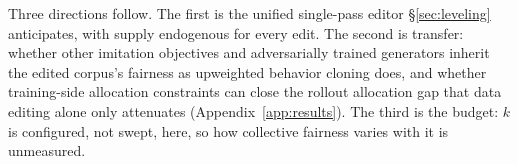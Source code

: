 Three directions follow. The first is the unified single-pass editor
\S\ref{sec:leveling} anticipates, with supply endogenous for every edit. The
second is transfer: whether other imitation objectives and adversarially
trained generators inherit the edited corpus's fairness as upweighted behavior
cloning does, and whether training-side allocation constraints can close the
rollout allocation gap that data editing alone only attenuates
(Appendix~\ref{app:results}). The third is the budget: $k$ is configured, not
swept, here, so how collective fairness varies with it is unmeasured.
